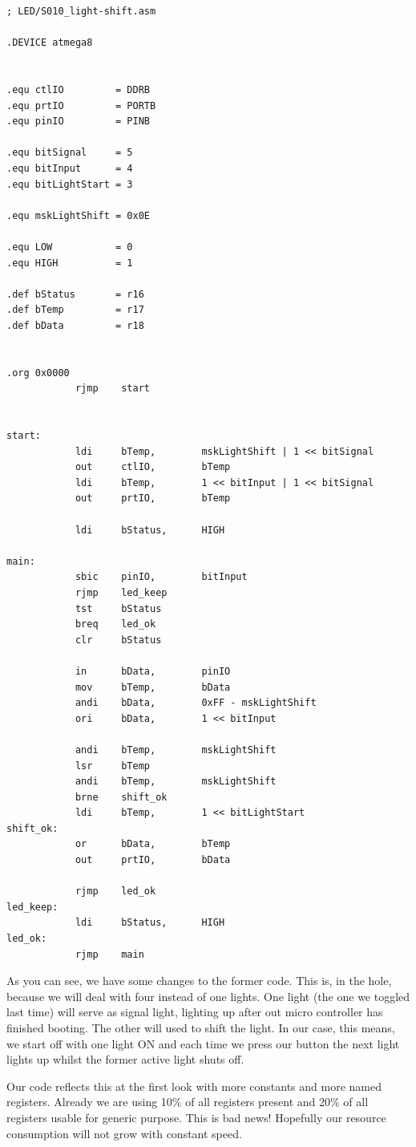 \begin{lstlisting}
; LED/S010_light-shift.asm

.DEVICE atmega8


.equ ctlIO         = DDRB
.equ prtIO         = PORTB
.equ pinIO         = PINB

.equ bitSignal     = 5
.equ bitInput      = 4
.equ bitLightStart = 3

.equ mskLightShift = 0x0E

.equ LOW           = 0
.equ HIGH          = 1

.def bStatus       = r16
.def bTemp         = r17
.def bData         = r18


.org 0x0000
            rjmp    start


start:
            ldi     bTemp,        mskLightShift | 1 << bitSignal
            out     ctlIO,        bTemp
            ldi     bTemp,        1 << bitInput | 1 << bitSignal
            out     prtIO,        bTemp

            ldi     bStatus,      HIGH

main:
            sbic    pinIO,        bitInput
            rjmp    led_keep
            tst     bStatus
            breq    led_ok
            clr     bStatus

            in      bData,        pinIO
            mov     bTemp,        bData
            andi    bData,        0xFF - mskLightShift
            ori     bData,        1 << bitInput

            andi    bTemp,        mskLightShift
            lsr     bTemp
            andi    bTemp,        mskLightShift
            brne    shift_ok
            ldi     bTemp,        1 << bitLightStart
shift_ok:
            or      bData,        bTemp
            out     prtIO,        bData

            rjmp    led_ok
led_keep:
            ldi     bStatus,      HIGH
led_ok:
            rjmp    main
\end{lstlisting}

As you can see, we have some changes to the former code. This is, in the hole, because we will deal with four instead of one lights. One light (the one we toggled last time) will serve as signal light, lighting up after out micro controller has finished booting. The other will used to shift the light. In our case, this means, we start off with one light ON and each time we press our button the next light lights up whilst the former active light shuts off.

Our code reflects this at the first look with more constants and more named registers. Already we are using 10\% of all registers present and 20\% of all registers usable for generic purpose. This is bad news! Hopefully our resource consumption will not grow with constant speed.

